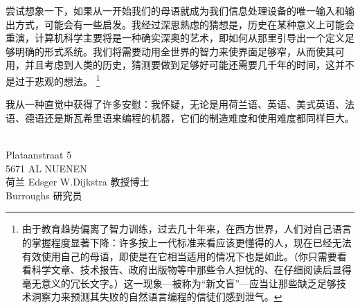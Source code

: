 \documentclass[a4paper,12pt]{article}
\begin{document}
尝试想象一下，如果从一开始我们的母语就成为我们信息处理设备的唯一输入和输出方式，可能会有一些启发。我经过深思熟虑的猜想是，历史在某种意义上可能会重演，计算机科学主要将是一种确实深奥的艺术，即如何从那里引导出一个定义足够明确的形式系统。我们将需要动用全世界的智力来使界面足够窄，从而使其可用，并且考虑到人类的历史，猜测要做到足够好可能还需要几千年的时间，这并不是过于悲观的想法。
\footnote{由于教育趋势偏离了智力训练，过去几十年来，在西方世界，人们对自己语言的掌握程度显著下降：许多按上一代标准来看应该更懂得的人，现在已经无法有效使用自己的母语，即使是在它相当适用的情况下也是如此。（你只需要看看科学文章、技术报告、政府出版物等中那些令人担忧的、在仔细阅读后显得毫无意义的冗长文字。）这一现象—被称为“新文盲”—应当让那些缺乏足够技术洞察力来预测其失败的自然语言编程的信徒们感到泄气。}

我从一种直觉中获得了许多安慰：我怀疑，无论是用荷兰语、英语、美式英语、法语、德语还是斯瓦希里语来编程的机器，它们的制造难度和使用难度都同样巨大。

　\\Plataanstraat 5\\
5671 AL NUENEN\\
荷兰 Edsger W.Dijkstra 教授博士\\
Burroughs 研究员\\
\end{document}
